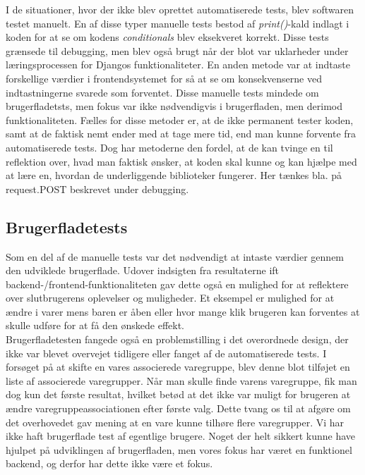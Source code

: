 \documentclass[]{article}
\begin{document}
I de situationer, hvor der ikke blev oprettet automatiserede tests, blev softwaren testet manuelt. En af disse typer manuelle tests bestod af \textit{print()}-kald indlagt i koden for at se om kodens \textit{conditionals} blev eksekveret korrekt. Disse tests grænsede til debugging, men blev også brugt når der blot var uklarheder under læringsprocessen for Djangos funktionaliteter. En anden metode var at indtaste forskellige værdier i frontendsystemet for så at se om konsekvenserne ved indtastningerne svarede som forventet. Disse manuelle tests mindede om brugerfladetsts, men fokus var ikke nødvendigvis i brugerfladen, men derimod funktionaliteten. 
Fælles for disse metoder er, at de ikke permanent tester koden, samt at de faktisk nemt ender med at tage mere tid, end man kunne forvente fra automatiserede tests. Dog har metoderne den fordel, at de kan tvinge en til reflektion over, hvad man faktisk ønsker, at koden skal kunne og kan hjælpe med at lære en, hvordan de underliggende biblioteker fungerer. Her tænkes bla. på request.POST beskrevet under debugging.

\subsection{Brugerfladetests}

Som en del af de manuelle tests var det nødvendigt at intaste værdier gennem den udviklede brugerflade. Udover indsigten fra resultaterne ift backend-/frontend-funktionaliteten gav dette også en mulighed for at reflektere over slutbrugerens oplevelser og muligheder. Et eksempel er mulighed for at ændre i varer mens baren er åben eller hvor mange klik brugeren kan forventes at skulle udføre for at få den ønskede effekt. \\
\indent Brugerfladetesten fangede også en problemstilling i det overordnede design, der ikke var blevet overvejet tidligere eller fanget af de automatiserede tests. I forsøget på at skifte en vares associerede varegruppe, blev denne blot tilføjet en liste af associerede varegrupper. Når man skulle finde varens varegruppe, fik man dog kun det første resultat, hvilket betød at det ikke var muligt for brugeren at ændre varegruppeassociationen efter første valg. Dette tvang os til at afgøre om det overhovedet gav mening at en vare kunne tilhøre flere varegrupper. Vi har ikke haft brugerflade test af egentlige brugere. Noget der helt sikkert kunne have hjulpet på udviklingen af brugerfladen, men vores fokus har været en funktionel backend, og derfor har dette ikke være et fokus.  
\end{document}
